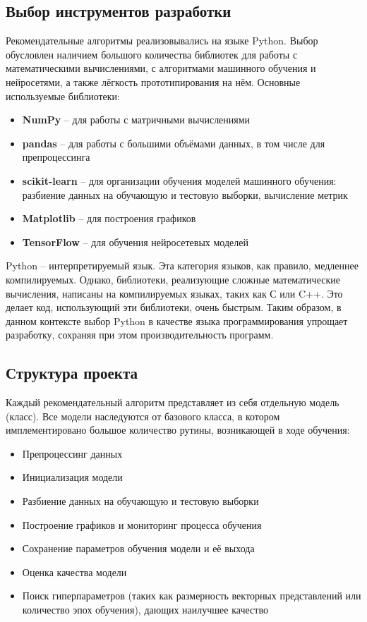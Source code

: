 \subsection{Выбор инструментов разработки}\label{subsec:development_tools}
Рекомендательные алгоритмы реализовывались на языке Python\cite{python}.
Выбор обусловлен наличием большого количества библиотек для работы с математическими вычислениями, с алгоритмами машинного обучения и нейросетями, а также лёгкость прототипирования на нём.
Основные используемые библиотеки:
\begin{itemize}
\item \textbf{NumPy}\cite{numpy} -- для работы с матричными вычислениями
\item \textbf{pandas}\cite{pandas} -- для работы с большими объёмами данных, в том числе для препроцессинга
\item \textbf{scikit-learn}\cite{scikit-learn} -- для организации обучения моделей машинного обучения: разбиение данных на обучающую и тестовую выборки, вычисление метрик
\item \textbf{Matplotlib}\cite{matplotlib} -- для построения графиков
\item \textbf{TensorFlow}\cite{tensorflow} -- для обучения нейросетевых моделей
\end{itemize}

Python -- интерпретируемый язык.
Эта категория языков, как правило, медленнее компилируемых.
Однако, библиотеки, реализующие сложные математические вычисления, написаны на компилируемых языках, таких как С\cite{c-language} или C++\cite{c++}.
Это делает код, использующий эти библиотеки, очень быстрым.
Таким образом, в данном контексте выбор Python в качестве языка программирования упрощает разработку, сохраняя при этом производительность программ.

\pagebreak
\subsection{Структура проекта}\label{subsec:project_structure}
Каждый рекомендательный алгоритм представляет из себя отдельную модель (класс).
Все модели наследуются от базового класса, в котором имплементировано большое количество рутины, возникающей в ходе обучения:
\begin{itemize}
\item Препроцессинг данных
\item Инициализация модели
\item Разбиение данных на обучающую и тестовую выборки
\item Построение графиков и мониторинг процесса обучения
\item Сохранение параметров обучения модели и её выхода
\item Оценка качества модели
\item Поиск гиперпараметров (таких как размерность векторных представлений или количество эпох обучения), дающих наилучшее качество
\end{itemize}

